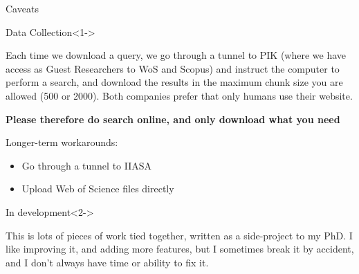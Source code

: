 \documentclass[9pt]{beamer}
\begin{document}
\begin{frame}{Caveats}

\begin{block}{Data Collection}<1->

Each time we download a query, we go through a tunnel to PIK (where we have access as Guest Researchers to WoS and Scopus) and instruct the computer to perform a search, and download the results in the maximum chunk size you are allowed (500 or 2000). Both companies prefer that only humans use their website.

\medskip

\textbf{Please therefore do search online, and only download what you need}
\medskip

Longer-term workarounds:
\begin{itemize}
	\item Go through a tunnel to IIASA
	\item Upload Web of Science files directly
\end{itemize}

\end{block}

\begin{block}{In development}<2->
	
	This is lots of pieces of work tied together, written as a side-project to my PhD. I like improving it, and adding more features, but I sometimes break it by accident, and I don't always have time or ability to fix it.
	
\end{block}


\end{frame}

\end{document}
